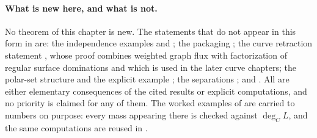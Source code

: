 \paragraph{What is new here, and what is not.}
No theorem of this chapter is new.  The statements that do not appear in
this form in \cite{BFJ16} are: the independence examples
 and
; the packaging
; the curve retraction statement
, whose proof combines weighted graph flux
with factorization of regular surface dominations and which is used in the
later curve chapters; the
polar-set structure  and the explicit
example ; the separations
; and .  All
are either elementary consequences of the cited results or explicit
computations, and no priority is claimed for any of them.  The worked
examples of  are carried to numbers on purpose: every
mass appearing there is checked against $\deg_CL$, and the same
computations are reused in .
